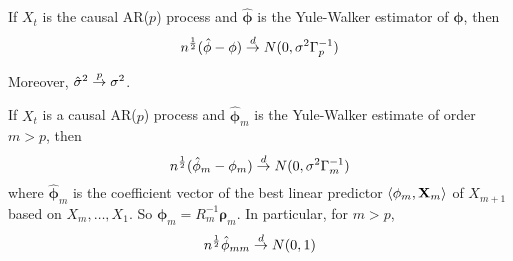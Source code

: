 \begin{thm}
  \label{defn:estimation_arma:1}
  If $X_{t}$ is the causal AR($p$) process and $\hat{\mathbf{\phi}}$ is
  the Yule-Walker estimator of $\mathbf{\phi}$, then
  \begin{equation}
    \label{eq:44}
    n^{\frac{1}{2}}(\hat{\mathbf{\phi}} - \mathbf{\phi}) \overset{d}{\rightarrow} N(0,
    \sigma^{2} \Gamma_{p}^{-1})
  \end{equation}

  Moreover, $\hat \sigma^{2} \overset{p}{\rightarrow} \sigma^{2}$.
\end{thm}

\begin{thm}
  \label{defn:estimation_arma:2}
  If $X_{t}$ is a causal AR($p$) process and $\hat{\mathbf{\phi}}_{m}$
  is the Yule-Walker estimate of order $m > p$, then
  \begin{equation}
    \label{eq:45}
    n^{\frac{1}{2}}(\hat{\mathbf{\phi}}_{m} - \mathbf{\phi}_{m}) \overset{d}{\rightarrow}
    N(0, \sigma^{2} \Gamma_{m}^{-1})
  \end{equation} where $\hat{\mathbf{\phi}}_{m}$ is  the coefficient
  vector of the best linear predictor $\IP{\mathbf{\phi}_{m}, \mathbf{X}_{m}}$
  of $X_{m+1}$ based on $X_{m}, \dots, X_{1}$.  So $\mathbf{\phi}_{m}
  = R^{-1}_{m} \mathbf{\rho}_{m}$.  In particular, for $m > p$,
  \begin{equation}
    \label{eq:46}
    n^{\frac{1}{2}} \hat \phi_{mm} \overset{d}{\rightarrow} N(0, 1)
  \end{equation}
\end{thm}

